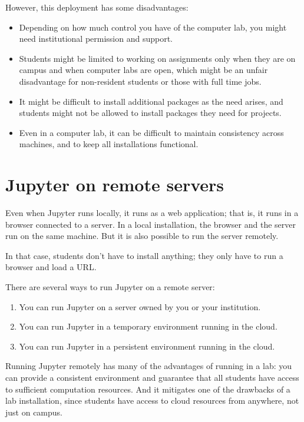 \documentclass[]{book}
\providecommand{\tightlist}{%
  \setlength{\itemsep}{0pt}\setlength{\parskip}{0pt}}
\begin{document}
However, this deployment has some disadvantages:

\begin{itemize}
\item
  Depending on how much control you have of the computer lab, you might
  need institutional permission and support.
\item
  Students might be limited to working on assignments only when they are
  on campus and when computer labs are open, which might be an unfair
  disadvantage for non-resident students or those with full time jobs.
\item
  It might be difficult to install additional packages as the need
  arises, and students might not be allowed to install packages they
  need for projects.
\item
  Even in a computer lab, it can be difficult to maintain consistency
  across machines, and to keep all installations functional.
\end{itemize}

\section{Jupyter on remote servers}\label{jupyter-on-remote-servers}

Even when Jupyter runs locally, it runs as a web application; that is,
it runs in a browser connected to a server. In a local installation, the
browser and the server run on the same machine. But it is also possible
to run the server remotely.

In that case, students don't have to install anything; they only have to
run a browser and load a URL.

There are several ways to run Jupyter on a remote server:

\begin{enumerate}
\def\labelenumi{\arabic{enumi}.}
\tightlist
\item
  You can run Jupyter on a server owned by you or your institution.
\item
  You can run Jupyter in a temporary environment running in the cloud.
\item
  You can run Jupyter in a persistent environment running in the cloud.
\end{enumerate}

Running Jupyter remotely has many of the advantages of running in a lab:
you can provide a consistent environment and guarantee that all students
have access to sufficient computation resources. And it mitigates one of
the drawbacks of a lab installation, since students have access to cloud
resources from anywhere, not just on campus.
\end{document}

